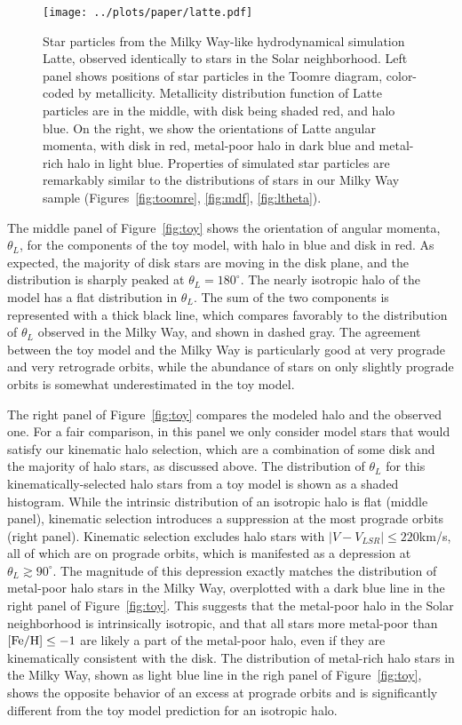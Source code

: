 \documentclass[apj, twocolappendix, numberedappendix, appendixfloats]{emulateapj}
\begin{document}
\begin{figure*}
\begin{center}
\texttt{[image: ../plots/paper/latte.pdf]}
\caption{Star particles from the Milky Way-like hydrodynamical simulation Latte, observed identically to stars in the Solar neighborhood.
Left panel shows positions of star particles in the Toomre diagram, color-coded by metallicity.
Metallicity distribution function of Latte particles are in the middle, with disk being shaded red, and halo blue.
On the right, we show the orientations of Latte angular momenta, with disk in red, metal-poor halo in dark blue and metal-rich halo in light blue.
Properties of simulated star particles are remarkably similar to the distributions of stars in our Milky Way sample (Figures~\ref{fig:toomre}, \ref{fig:mdf}, \ref{fig:ltheta}).}
\label{fig:latte}
\end{center}
\end{figure*}

The middle panel of Figure~\ref{fig:toy} shows the orientation of angular momenta, $\theta_L$, for the components of the toy model, with halo in blue and disk in red.
As expected, the majority of disk stars are moving in the disk plane, and the distribution is sharply peaked at $\theta_L=180^\circ$.
The nearly isotropic halo of the \citet{bensby2003} model has a flat distribution in $\theta_L$.
The sum of the two components is represented with a thick black line, which compares favorably to the distribution of $\theta_L$ observed in the Milky Way, and shown in dashed gray.
The agreement between the toy model and the Milky Way is particularly good at very prograde and very retrograde orbits, while the abundance of stars on only slightly prograde orbits is somewhat underestimated in the toy model.

The right panel of Figure~\ref{fig:toy} compares the modeled halo and the observed one.
For a fair comparison, in this panel we only consider model stars that would satisfy our kinematic halo selection, which are a combination of some disk and the majority of halo stars, as discussed above.
The distribution of $\theta_L$ for this kinematically-selected halo stars from a toy model is shown as a shaded histogram.
While the intrinsic distribution of an isotropic halo is flat (middle panel), kinematic selection introduces a suppression at the most prograde orbits (right panel).
Kinematic selection excludes halo stars with $|V-V_{LSR}|\leq220$\;km/s, all of which are on prograde orbits, which is manifested as a depression at $\theta_L\gtrsim90^\circ$.
The magnitude of this depression exactly matches the distribution of metal-poor halo stars in the Milky Way, overplotted with a dark blue line in the right panel of Figure~\ref{fig:toy}.
This suggests that the metal-poor halo in the Solar neighborhood is intrinsically isotropic, and that all stars more metal-poor than $\rm[Fe/H]\leq-1$ are likely a part of the metal-poor halo, even if they are kinematically consistent with the disk.
The distribution of metal-rich halo stars in the Milky Way, shown as light blue line in the righ panel of Figure~\ref{fig:toy}, shows the opposite behavior of an excess at prograde orbits and is significantly different from the toy model prediction for an isotropic halo.
\end{document}
